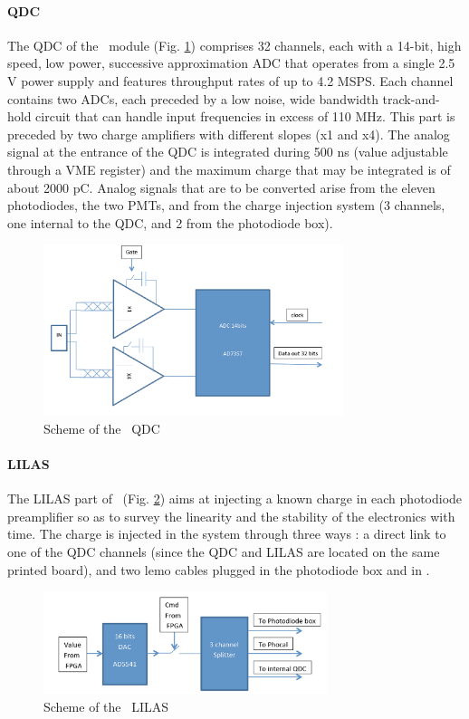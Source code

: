 \paragraph{QDC}

The QDC of the \lascar~module (Fig. \ref{fig:laslascarqdc}) comprises 32 channels, each with a 14-bit, high speed, low power, successive approximation ADC that operates from a single 2.5 V power supply and features throughput rates of up to 4.2 MSPS. Each channel contains two ADCs, each preceded by a low noise, wide bandwidth track-and-hold circuit that can handle input frequencies in excess of 110 MHz. This part is preceded by two charge amplifiers with different slopes (x1 and x4). The analog signal at the entrance of the QDC is integrated during 500 ns (value adjustable through a VME register) and the maximum charge that may be integrated is of about 2000 pC. Analog signals that are to be converted arise from the eleven photodiodes, the two PMTs, and from the charge injection system (3 channels, one internal to the QDC, and 2 from the photodiode box). 
 
\begin{figure}[htbp]

\centering
\includegraphics[height=5cm]{figures/qdc.pdf}
\caption{Scheme of the \lascar~QDC}\label{fig:laslascarqdc}
\end{figure}

\paragraph{LILAS}
The LILAS part of \lascar~(Fig. \ref{fig:laslascarlilas}) aims at injecting a known charge in each photodiode preamplifier so as to survey the linearity and the stability of the electronics with time. The charge is injected in the system through three ways : a direct link to one of the QDC channels (since the QDC and LILAS are located on the same printed board), and two lemo cables plugged in the photodiode box and in \phocal.  

\begin{figure}[htbp]

\centering
\includegraphics[height=3cm]{figures/lilas.pdf}
\caption{Scheme of the \lascar~LILAS}\label{fig:laslascarlilas}
\end{figure}


